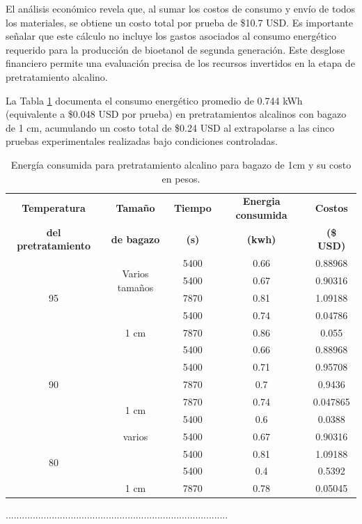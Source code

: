 \documentclass[12pt]{article}
\begin{document}
    El análisis económico revela que, al sumar los costos de consumo y envío de todos los materiales, se obtiene un costo total por prueba de \$10.7 USD. Es importante señalar que este cálculo no incluye los gastos asociados al consumo energético requerido para la producción de bioetanol de segunda generación. Este desglose financiero permite una evaluación precisa de los recursos invertidos en la etapa de pretratamiento alcalino.
			
La Tabla \ref{tabla costo 1 cm} documenta el consumo energético promedio de 0.744 kWh (equivalente a \$0.048 USD por prueba) en pretratamientos alcalinos con bagazo de 1 cm, acumulando un costo total de \$0.24 USD al extrapolarse a las cinco pruebas experimentales realizadas bajo condiciones controladas.
			


\begin{table}[H]
	\centering
\caption{Energía consumida para pretratamiento alcalino para bagazo de 1cm y su costo en pesos. }
\label{tabla costo 1 cm}
\resizebox{13cm}{!} {
	\begin{tabular}{|c|c|c|c|c|}
		\hline
		\textbf{Temperatura} & \textbf{Tamaño } & \textbf{Tiempo} & \textbf{Energia consumida} & \textbf{Costos } \\ 
		\textbf{del pretratamiento} &	\textbf{ de bagazo}  &	\textbf{ (s)} & 	\textbf{(kwh) }& 	\textbf{(\$ USD)} \\ \hline
		\multirow{5}{*}{95} & \multirow{3}{*}{Varios tamaños} & 5400 & 0.66 & 0.88968  \\  \cline{3-5}
		&  & 5400 & 0.67 & 0.90316  \\  \cline{3-5}
		&  & 7870 & 0.81 & 1.09188  \\ \cline{2-5}
			& \multirow{3}{*}{1 cm} & 5400 & 0.74 & 0.04786  \\  \cline{3-5}
		&  & 7870 & 0.86 & 0.055  \\  \hline
	
	 \multirow{5}{*}{90} & \multirow{3}{*}{Varios tamaños} & 5400 & 0.66 & 0.88968  \\  \cline{3-5}
	    &  & 5400 & 0.71 & 0.95708  \\  \cline{3-5}
	    &  & 7870 & 0.7  & 0.9436  \\ 	\cline{2-5}
		 & \multirow{2}{*}{1 cm} & 7870 & 0.74 & 0.047865  \\  \cline{3-5}
		&  & 5400 & 0.6 & 0.0388 \\   \hline
	\multirow{5}{*}{80}	 & varios & 5400 & 0.67 & 0.90316  \\  \cline{3-5}
	&  & 5400 & 0.81 & 1.09188  \\  \cline{3-5}
	&  & 5400 & 0.4  & 0.5392  \\ \cline{2-5}
	 & 1 cm & 7870 & 0.78 & 0.05045 \\ \hline
\end{tabular}}

\end{table}
..................................................................................
\end{document}
